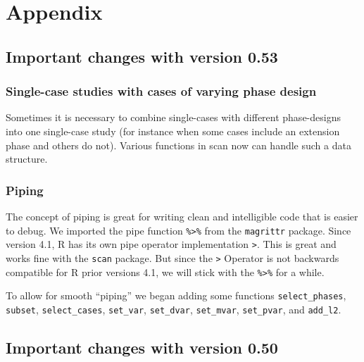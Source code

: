 \documentclass[
]{book}
\begin{document}
\hypertarget{appendix}{%
\chapter{Appendix}\label{appendix}}

\hypertarget{important-changes-with-version-0.53}{%
\section{Important changes with version 0.53}\label{important-changes-with-version-0.53}}

\hypertarget{single-case-studies-with-cases-of-varying-phase-design}{%
\subsection{Single-case studies with cases of varying phase design}\label{single-case-studies-with-cases-of-varying-phase-design}}

Sometimes it is necessary to combine single-cases with different phase-designs into one single-case study (for instance when some cases include an extension phase and others do not). Various functions in scan now can handle such a data structure.

\hypertarget{piping}{%
\subsection{Piping}\label{piping}}

The concept of piping is great for writing clean and intelligible code that is easier to debug. We imported the pipe function \texttt{\%\textgreater{}\%} from the \texttt{magrittr} package. Since version 4.1, R has its own pipe operator implementation \texttt{\textbar{}\textgreater{}}. This is great and works fine with the \texttt{scan} package. But since the \texttt{\textbar{}\textgreater{}} Operator is not backwards compatible for R prior versions 4.1, we will stick with the \texttt{\%\textgreater{}\%} for a while.

To allow for smooth ``piping'' we began adding some functions \texttt{select\_phases}, \texttt{subset}, \texttt{select\_cases}, \texttt{set\_var}, \texttt{set\_dvar}, \texttt{set\_mvar}, \texttt{set\_pvar}, and \texttt{add\_l2}.

\hypertarget{important-changes-with-version-0.50}{%
\section{Important changes with version 0.50}\label{important-changes-with-version-0.50}}
\end{document}
